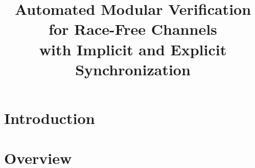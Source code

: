 \documentclass[acmsmall,10pt,review,anonymous]{acmart}\settopmatter{printfolios=true}
\begin{document}
\captionsetup[figure]{labelfont=bf,textfont=normalfont,singlelinecheck=on}


\title{Automated Modular Verification for
Race-Free Channels  \\ with Implicit and Explicit Synchronization}


\author{}
\affiliation{}


\begin{abstract}
  
\end{abstract}

\maketitle





\setcounter{ExampleNo}{0}
\newcommand{\setExampleNo}[1]{\refstepcounter{ExampleNo}\arabic{ExampleNo}\label{#1}}


\section{Introduction}


\renewcommand\labelitemi{\tiny$\bullet$}
\section{Overview}
\label{sec.overview}

\end{document}

